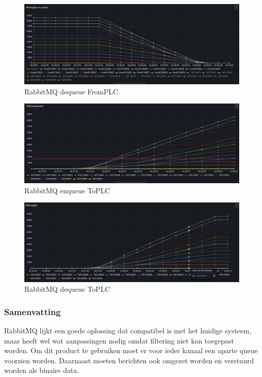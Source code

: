 \begin{figure}[h!]
  \centering
  \includegraphics[width=.95\textwidth]{img/rabbitmq-dequeue-count-FromPLC.png}
  \caption{\label{fig:rabbitmq_dequeue_fromplc_count}RabbitMQ dequeue FromPLC}
\end{figure}

\begin{figure}[h!]
  \centering
  \includegraphics[width=.95\textwidth]{img/rabbitmq-enqueue-count-ToPLC.png}
  \caption{\label{fig:rabbitmq_enqueue_toplc_count}RabbitMQ enqueue ToPLC}
\end{figure}

\begin{figure}[h!]
  \centering
  \includegraphics[width=.95\textwidth]{img/rabbitmq-dequeue-count-ToPLC.png}
  \caption{\label{fig:fig:rabbitmq_dequeue_fromplc_count}RabbitMQ dequeue ToPLC}
\end{figure}

\subsubsection{Samenvatting}
RabbitMQ lijkt een goede oplossing dat compatibel is met het huidige systeem, 
maar heeft wel wat aanpassingen nodig omdat filtering niet kan toegepast worden.
Om dit product te gebruiken moet er voor ieder kanaal een aparte queue voorzien worden.
Daarnaast moeten berichten ook omgezet worden en verstuurd worden als binaire data.


